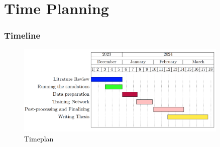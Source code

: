 \documentclass[aspectratio=169]{beamer}
\begin{document}

\begin{frame}
  \frametitle{}\
  
\begin{minipage}{0.3\textwidth}


    \vspace{\baselineskip}


\end{minipage}
\begin{minipage}{0.35\textwidth}
\end{minipage}
\begin{minipage}{0.3\textwidth}


\end{minipage}
\end{frame}


\section{Time Planning}
\begin{frame}
  \frametitle{Timeline}
  \begin{center}
    \begin{figure}
      \includegraphics[width=0.9\textwidth]{figs/Timeplan.png}
      \caption{Timeplan}
    \end{figure}
  \end{center} 
\end{frame}

\begin{frame}
  \begin{minipage}{0.1\textwidth}
    \hfill
  \end{minipage}
  \begin{minipage}{0.89\textwidth}
    \\
  \end{minipage}
  
\end{frame}
\end{document}
